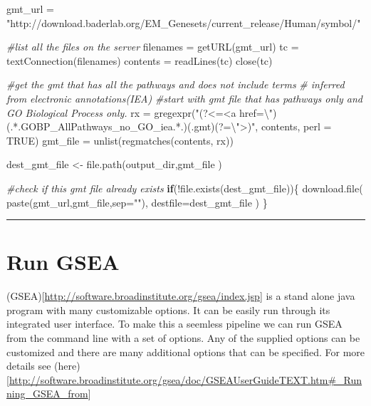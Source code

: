 \documentclass[
]{book}
\newenvironment{Shaded}{\begin{snugshade}}{\end{snugshade}}
\newcommand{\AttributeTok}[1]{\textcolor[rgb]{0.77,0.63,0.00}{#1}}
\newcommand{\CommentTok}[1]{\textcolor[rgb]{0.56,0.35,0.01}{\textit{#1}}}
\newcommand{\ConstantTok}[1]{\textcolor[rgb]{0.00,0.00,0.00}{#1}}
\newcommand{\ControlFlowTok}[1]{\textcolor[rgb]{0.13,0.29,0.53}{\textbf{#1}}}
\newcommand{\FunctionTok}[1]{\textcolor[rgb]{0.00,0.00,0.00}{#1}}
\newcommand{\NormalTok}[1]{#1}
\newcommand{\OtherTok}[1]{\textcolor[rgb]{0.56,0.35,0.01}{#1}}
\newcommand{\SpecialCharTok}[1]{\textcolor[rgb]{0.00,0.00,0.00}{#1}}
\newcommand{\StringTok}[1]{\textcolor[rgb]{0.31,0.60,0.02}{#1}}
\begin{document}
\begin{Shaded}
\begin{Highlighting}[]
\NormalTok{gmt\_url }\OtherTok{=} \StringTok{"http://download.baderlab.org/EM\_Genesets/current\_release/Human/symbol/"}

\CommentTok{\#list all the files on the server}
\NormalTok{filenames }\OtherTok{=} \FunctionTok{getURL}\NormalTok{(gmt\_url)}
\NormalTok{tc }\OtherTok{=} \FunctionTok{textConnection}\NormalTok{(filenames)}
\NormalTok{contents }\OtherTok{=} \FunctionTok{readLines}\NormalTok{(tc)}
\FunctionTok{close}\NormalTok{(tc)}

\CommentTok{\#get the gmt that has all the pathways and does not include terms }
\CommentTok{\# inferred from electronic annotations(IEA)}
\CommentTok{\#start with gmt file that has pathways only and GO Biological Process only.}
\NormalTok{rx }\OtherTok{=} \FunctionTok{gregexpr}\NormalTok{(}\StringTok{"(?\textless{}=\textless{}a href=}\SpecialCharTok{\textbackslash{}"}\StringTok{)(.*.GOBP\_AllPathways\_no\_GO\_iea.*.)(.gmt)(?=}\SpecialCharTok{\textbackslash{}"}\StringTok{\textgreater{})"}\NormalTok{,}
\NormalTok{  contents, }\AttributeTok{perl =} \ConstantTok{TRUE}\NormalTok{)}
\NormalTok{gmt\_file }\OtherTok{=} \FunctionTok{unlist}\NormalTok{(}\FunctionTok{regmatches}\NormalTok{(contents, rx))}

\NormalTok{dest\_gmt\_file }\OtherTok{\textless{}{-}} \FunctionTok{file.path}\NormalTok{(output\_dir,gmt\_file )}

\CommentTok{\#check if this gmt file already exists}
\ControlFlowTok{if}\NormalTok{(}\SpecialCharTok{!}\FunctionTok{file.exists}\NormalTok{(dest\_gmt\_file))\{}
  \FunctionTok{download.file}\NormalTok{(}
    \FunctionTok{paste}\NormalTok{(gmt\_url,gmt\_file,}\AttributeTok{sep=}\StringTok{""}\NormalTok{),}
    \AttributeTok{destfile=}\NormalTok{dest\_gmt\_file}
\NormalTok{  )}
\NormalTok{\}}
\end{Highlighting}
\end{Shaded}

\begin{center}\rule{0.5\linewidth}{0.5pt}\end{center}

\hypertarget{run-gsea}{%
\section{Run GSEA}\label{run-gsea}}

(GSEA){[}\url{http://software.broadinstitute.org/gsea/index.jsp}{]} is a stand alone java program with many customizable options. It can be easily run through its integrated user interface. To make this a seemless pipeline we can run GSEA from the command line with a set of options. Any of the supplied options can be customized and there are many additional options that can be specified. For more details see (here){[}\url{http://software.broadinstitute.org/gsea/doc/GSEAUserGuideTEXT.htm\#_Running_GSEA_from}{]}
\end{document}
